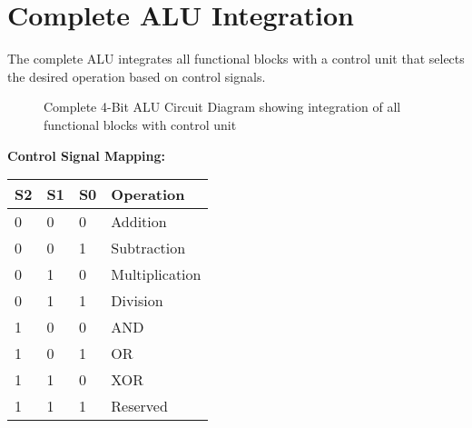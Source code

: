 \section{Complete ALU Integration}

The complete ALU integrates all functional blocks with a control unit that selects the desired operation based on control signals.

\begin{figure}[h]
    \centering
    \caption{Complete 4-Bit ALU Circuit Diagram showing integration of all functional blocks with control unit}
    \label{fig:complete-alu}
\end{figure}

\textbf{Control Signal Mapping:}
\begin{table}
\centering
\begin{tabular}{llll}
\toprule
\textbf{S2} & \textbf{S1} & \textbf{S0} & \textbf{Operation} \\
\midrule
0 & 0 & 0 & Addition \\
0 & 0 & 1 & Subtraction \\
0 & 1 & 0 & Multiplication \\
0 & 1 & 1 & Division \\
1 & 0 & 0 & AND \\
1 & 0 & 1 & OR \\
1 & 1 & 0 & XOR \\
1 & 1 & 1 & Reserved \\
\bottomrule
\end{tabular}
\label{tab:control-signals}
\end{table}
